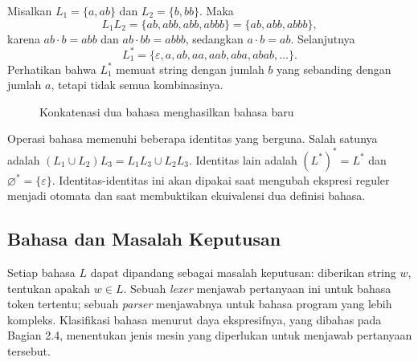 \begin{contoh}
Misalkan \(L_1 = \{a, ab\}\) dan \(L_2 = \{b, bb\}\). Maka
\[
L_1 L_2 = \{ab, abb, abb, abbb\} = \{ab, abb, abbb\},
\]
karena \(ab \cdot b = abb\) dan \(ab \cdot bb = abbb\), sedangkan
\(a \cdot b = ab\). Selanjutnya
\[
L_1^{*} = \{\varepsilon, a, ab, aa, aab, aba, abab, \ldots\}.
\]
Perhatikan bahwa \(L_1^{*}\) memuat string dengan jumlah \(b\) yang
sebanding dengan jumlah \(a\), tetapi tidak semua kombinasinya.
\end{contoh}

\begin{figure}[H]
\centering
{}
\caption{Konkatenasi dua bahasa menghasilkan bahasa baru}
\label{fig:ch02-konkatenasi}
\end{figure}

Operasi bahasa memenuhi beberapa identitas yang berguna. Salah satunya
adalah \((L_1 \cup L_2)L_3 = L_1L_3 \cup L_2L_3\). Identitas lain
adalah \((L^{*})^{*} = L^{*}\) dan \(\varnothing^{*} =
\{\varepsilon\}\). Identitas-identitas ini akan dipakai saat
mengubah ekspresi reguler menjadi otomata dan saat membuktikan
ekuivalensi dua definisi bahasa.

\subsection{Bahasa dan Masalah Keputusan}

Setiap bahasa \(L\) dapat dipandang sebagai masalah keputusan:
diberikan string \(w\), tentukan apakah \(w \in L\). Sebuah
\emph{lexer} menjawab pertanyaan ini untuk bahasa token tertentu;
sebuah \emph{parser} menjawabnya untuk bahasa program yang lebih
kompleks. Klasifikasi bahasa menurut daya ekspresifnya, yang dibahas
pada Bagian 2.4, menentukan jenis mesin yang diperlukan untuk
menjawab pertanyaan tersebut.

